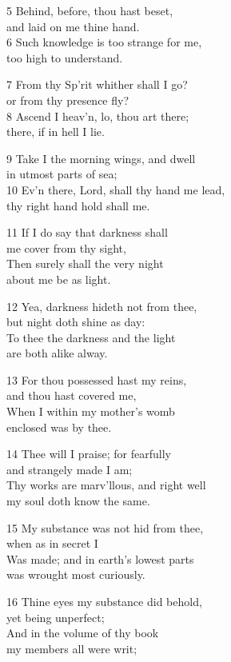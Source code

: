 5 Behind, before, thou hast beset,\\
and laid on me thine hand.\\
6 Such knowledge is too strange for me,\\
too high to understand.

7 From thy Sp’rit whither shall I go?\\
or from thy presence fly?\\
8 Ascend I heav’n, lo, thou art there;\\
there, if in hell I lie.

9 Take I the morning wings, and dwell\\
in utmost parts of sea;\\
10 Ev’n there, Lord, shall thy hand me lead,\\
thy right hand hold shall me.

11 If I do say that darkness shall\\
me cover from thy sight,\\
Then surely shall the very night\\
about me be as light.

12 Yea, darkness hideth not from thee,\\
but night doth shine as day:\\
To thee the darkness and the light\\
are both alike alway.

13 For thou possessed hast my reins,\\
and thou hast covered me,\\
When I within my mother’s womb\\
enclosed was by thee.

14 Thee will I praise; for fearfully\\
and strangely made I am;\\
Thy works are marv’llous, and right well\\
my soul doth know the same.

15 My substance was not hid from thee,\\
when as in secret I\\
Was made; and in earth’s lowest parts\\
was wrought most curiously.

16 Thine eyes my substance did behold,\\
yet being unperfect;\\
And in the volume of thy book\\
my members all were writ;

